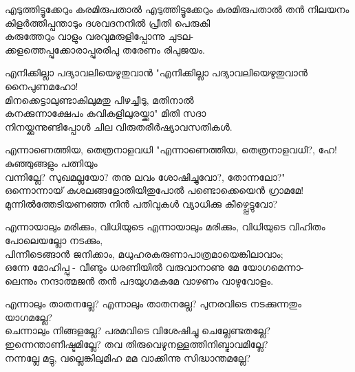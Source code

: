 \begin{enumerate}

\begin{slokam}{\VSk}{\RV}{എടുത്തിട്ടൂക്കേറും കരമിരുപതാൽ}
എടുത്തിട്ടൂക്കേറും കരമിരുപതാൽ തൻ നിലയനം\\
കിളർത്തിപ്പന്താടും ദശവദനനിൽ പ്രീതി പെരുകി\\
കരുത്തേറും വാളും വരവുമരുളിപ്പോന്നു ചുടല-\\
ക്കളത്തെപ്പുക്കോരാപ്പുരരിപു തരേണം രിപുജയം.
\end{slokam}


\begin{slokam}{\VSk}{\VenM}{എനിക്കില്ലാ പദ്യാവലിയെഴുതുവാൻ}
"എനിക്കില്ലാ പദ്യാവലിയെഴുതുവാൻ നൈപുണമഹോ!\\
മിനക്കെട്ടാലുണ്ടാകിലുമതു പിഴച്ചീടു, മതിനാൽ\\
കനക്കുന്നാക്ഷേപം കവികളിലുരയ്ക്കാ" മിതി സദാ\\
നിനയ്ക്കുന്നുണ്ടിപ്പോള്‍ ചില വിരുതരീർഷ്യാവസതികള്‍.
\end{slokam}


\begin{slokam}{\VSv}{\HM}{എന്നാണെത്തിയ,  തെത്രനാളവധി}
"എന്നാണെത്തിയ,  തെത്രനാളവധി?, ഹേ! കുഞ്ഞുങ്ങളും പത്നിയും \\
വന്നില്ലേ? സുഖമല്ലയോ? തനു ലവം ശോഷിച്ചുവോ?, തോന്നലോ?" \\
ഒന്നൊന്നായ് കുശലങ്ങളോതിയിതുപോൽ പണ്ടൊക്കെയെൻ ഗ്രാമമേ! \\
മുന്നിൽത്തേടിയണഞ്ഞ നിൻ പതിവുകൾ വ്യാധിക്കു കീഴ്പ്പെട്ടുവോ?
\end{slokam}



\begin{slokam}{\VSr}{\Balendu}{എന്നായാലും മരിക്കും, വിധിയുടെ}
എന്നായാലും മരിക്കും, വിധിയുടെ വിഹിതം പോലെയല്ലോ നടക്കും,\\
പിന്നീടെങ്ങാന്‍ ജനിക്കാം, മധുഹരകരുണാപാത്രമായെങ്കിലാവാം;\\
ഒന്നേ മോഹിപ്പു - വീണ്ടും ധരണിയില്‍ വരുവാനാണു മേ യോഗമെന്നാ-\\
ലെന്നും നന്ദാത്മജന്‍ തന്‍ പദയുഗമകമേ വാഴണം വാഴുവോളം.
\end{slokam}




\begin{slokam}{\VSr}{\KKT}{എന്നാലും താതനല്ലേ?}
എന്നാലും താതനല്ലേ? പുനരവിടെ നടക്കുന്നതും യാഗമല്ലേ?\\
ചെന്നാലും നിങ്ങളല്ലേ? പരമവിടെ വിശേഷിച്ചു ചെല്ലേണ്ടതല്ലേ?\\
ഇന്നെന്താണീഷ്ടമില്ലേ? തവ തിരുവെഴുനള്ളത്തിനിബ്ഭാവമില്ലേ?\\
നന്നല്ലേ മട്ടു, വല്ലെങ്കിലുമിഹ മമ വാക്കിന്നു സിദ്ധാന്തമല്ലേ?
\end{slokam}


\end{enumerate}
